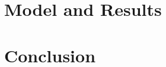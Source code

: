\documentclass[letterpaper]{article} %
\begin{document}
\section{Model and Results}



\section{Conclusion}























\end{document}

